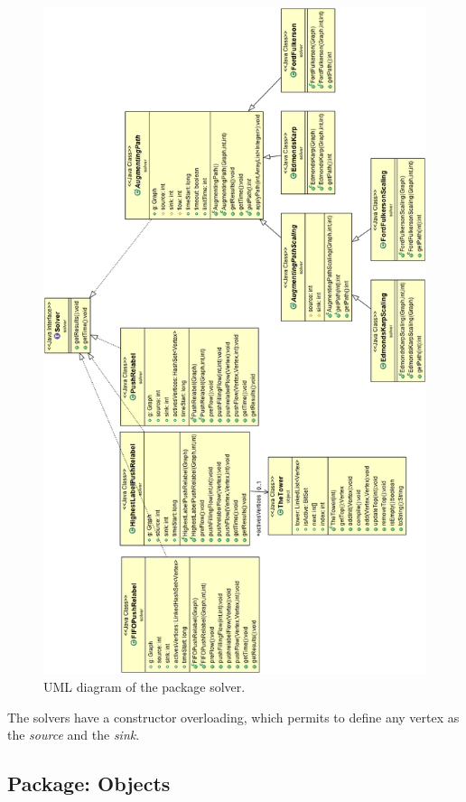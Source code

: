 \begin{figure}
\centering
\includegraphics[scale=0.5]{images/solver_diagram.png}
\caption{UML diagram of the package solver.}
\label{img:solver}
\end{figure}

The solvers have a constructor overloading, which permits to define any vertex as the \textit{source} and the \textit{sink}.

\subsection{Package: Objects}

